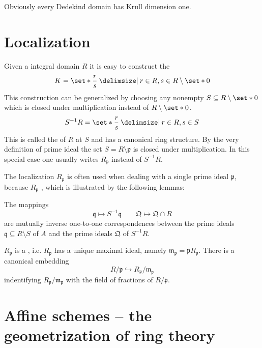 Obviously every Dedekind domain has Krull dimension one.

\section{Localization}
\label{sec:localization}
Given a integral domain $R$ it is easy to construct the 
\[
	K = \set*{\frac{r}{s} \given r \in R, s \in R \setminus \set*{0}}
\]
This construction can be generalized by choosing any nonempty $S \subseteq R \setminus \set*{0}$ which is closed under multiplication instead of $R \setminus \set*{0}$.
\[
	S^{-1}R = \set*{\frac{r}{s} \given r \in R, s \in S}
\]
This is called the  of $R$ at $S$ and has a canonical ring structure.
By the very definition of prime ideal the set $S=R \setminus \mathfrak{p}$ is closed under multiplication.
In this special case one usually writes $R_{\mathfrak{p}}$ instead of $S^{-1}R$.

The localization $R_{\mathfrak{p}}$ is often used when dealing with a single prime ideal $\mathfrak{p}$, because $R_{\mathfrak{p}}$ , which is illustrated by the following lemmas:

\begin{lemma}
	The mappings
	\[
		\mathfrak{q} \longmapsto S^{-1}\mathfrak{q} \qquad \mathfrak{Q} \longmapsto \mathfrak{Q} \cap R
	\]
	are mutually inverse one-to-one correspondences between the prime ideals $\mathfrak{q} \subseteq R \setminus S$ of $A$ and the prime ideals $\mathfrak{Q}$ of $S^{-1}R$.
\end{lemma}

\begin{lemma}
	$R_{\mathfrak{p}}$ is a , i.e. $R_{\mathfrak{p}}$ has a unique maximal ideal, namely $\mathfrak{m}_{\mathfrak{p}} = \mathfrak{p} R_{\mathfrak{p}}$.
	There is a canonical embedding
	\[
		R/\mathfrak{p} \hookrightarrow R_{\mathfrak{p}}/\mathfrak{m}_{\mathfrak{p}}
	\]
	indentifying $R_{\mathfrak{p}}/\mathfrak{m}_{\mathfrak{p}}$ with the field of fractions of $R/\mathfrak{p}$.
\end{lemma}





\section{Affine schemes -- the geometrization of ring theory}
\label{sec:affine schemes}

